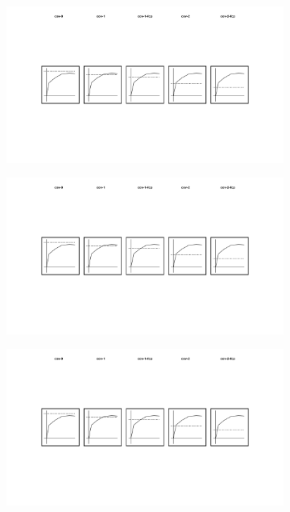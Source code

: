 \begin{figure}
  \centering
  \begin{subfigure}{0.19\textwidth}
    \centering
    \includegraphics[width=\textwidth]{img/cov-0}
  \end{subfigure}
  \begin{subfigure}{0.19\textwidth}
    \centering
    \includegraphics[width=\textwidth]{img/cov-1}
  \end{subfigure}
  \begin{subfigure}{0.19\textwidth}
    \centering
    \includegraphics[width=\textwidth]{img/cov-1-fcp}

\end{subfigure}
\end{figure}
